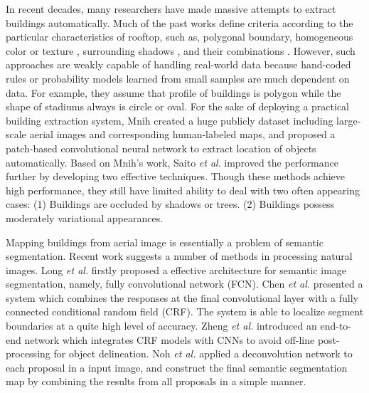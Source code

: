 \documentclass[runningheads]{llncs}
\begin{document}
   In recent decades, many researchers have made massive attempts to extract buildings automatically. Much of the past works define criteria according to the particular  characteristics of rooftop, such as, polygonal boundary\cite{noronha2001detection,nosrati2009novel,izadi2012three,wang2015efficient}, homogeneous color or texture \cite{cote2013automatic}, surrounding shadows \cite{B2008Building,ok2013automated,chen2014shadow,ngoautomatic}, and their combinations \cite{baluyan2013novel,li2015robust}. However, such approaches are weakly capable of handling real-world data because hand-coded rules or probability models learned from small samples are much dependent on data. For example, they assume that profile of buildings is polygon while the shape of stadiums always is circle or oval. For the sake of deploying a practical building extraction system, Mnih \cite{Mnih2013Machine} created a huge publicly dataset including large-scale aerial images and corresponding human-labeled maps, and proposed a patch-based convolutional neural network to extract location of objects automatically. Based on Mnih's work, Saito \textit{et al}. \cite{Saito2016Multiple} improved the performance further by developing two effective techniques. Though these methods achieve high performance, they still have limited ability to deal with two often appearing cases: (1) Buildings are  occluded by shadows or trees. (2) Buildings possess moderately variational appearances. 
      
   Mapping buildings from aerial image is essentially a problem of semantic segmentation. Recent work suggests a number of methods in processing natural images. Long \textit{et al.} \cite{Long2014Fully} firstly proposed a effective architecture for semantic image segmentation, namely, fully convolutional network (FCN).  
Chen \textit{et al.} \cite{chen14semantic} presented a system which combines the responses at the final convolutional layer with a fully connected conditional random field (CRF). The system is able to localize segment boundaries at a quite high level of accuracy. Zheng \textit{et al.} \cite{Zheng2015Conditional} introduced an end-to-end network  which integrates CRF models with CNNs to avoid off-line post-processing  for object delineation. Noh \textit{et al.} \cite{Noh2015Learning} applied a deconvolution network to each proposal in a input image, and construct the final semantic segmentation map by combining the results from all proposals in a simple manner.
     
\end{document}
